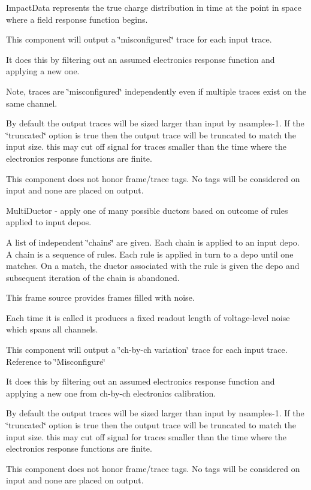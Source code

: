 Impact\+Data represents the true charge distribution in time at the point in space where a field response function begins.

This component will output a \char`\"{}misconfigured\char`\"{} trace for each input trace.

It does this by filtering out an assumed electronics response function and applying a new one.

Note, traces are \char`\"{}misconfigured\char`\"{} independently even if multiple traces exist on the same channel.

By default the output traces will be sized larger than input by nsamples-\/1. If the \char`\"{}truncated\char`\"{} option is true then the output trace will be truncated to match the input size. this may cut off signal for traces smaller than the time where the electronics response functions are finite.

This component does not honor frame/trace tags. No tags will be considered on input and none are placed on output.

Multi\+Ductor -\/ apply one of many possible ductors based on outcome of rules applied to input depos.

A list of independent \char`\"{}chains\char`\"{} are given. Each chain is applied to an input depo. A chain is a sequence of rules. Each rule is applied in turn to a depo until one matches. On a match, the ductor associated with the rule is given the depo and subsequent iteration of the chain is abandoned.

This frame source provides frames filled with noise.

Each time it is called it produces a fixed readout length of voltage-\/level noise which spans all channels.

This component will output a \char`\"{}ch-\/by-\/ch variation\char`\"{} trace for each input trace. Reference to \char`\"{}\+Misconfigure\char`\"{}

It does this by filtering out an assumed electronics response function and applying a new one from ch-\/by-\/ch electronics calibration.

By default the output traces will be sized larger than input by nsamples-\/1. If the \char`\"{}truncated\char`\"{} option is true then the output trace will be truncated to match the input size. this may cut off signal for traces smaller than the time where the electronics response functions are finite.

This component does not honor frame/trace tags. No tags will be considered on input and none are placed on output.

